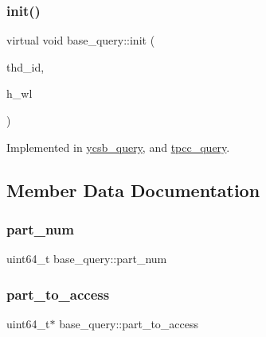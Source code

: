 \subsubsection{\texorpdfstring{init()}{init()}}
{\footnotesize\ttfamily virtual void base\+\_\+query\+::init (\begin{DoxyParamCaption}\item[{uint64\+\_\+t}]{thd\+\_\+id,  }\item[{\hyperlink{classworkload}{workload} $\ast$}]{h\+\_\+wl }\end{DoxyParamCaption})\hspace{0.3cm}{\ttfamily [pure virtual]}}



Implemented in \hyperlink{classycsb__query_a05e09ce39a834921f0b83103ff5ec5e1}{ycsb\+\_\+query}, and \hyperlink{classtpcc__query_a0bb03655040cf0f96ee0601c02c8876f}{tpcc\+\_\+query}.



\subsection{Member Data Documentation}
\mbox{\label{classbase__query_a339bb4ad3eb5490c52fd467267b85fd7}} 
\subsubsection{\texorpdfstring{part\+\_\+num}{part\_num}}
{\footnotesize\ttfamily uint64\+\_\+t base\+\_\+query\+::part\+\_\+num}

\mbox{\label{classbase__query_a81d79eecd1b85d1bd9818f111dadec0c}} 
\subsubsection{\texorpdfstring{part\+\_\+to\+\_\+access}{part\_to\_access}}
{\footnotesize\ttfamily uint64\+\_\+t$\ast$ base\+\_\+query\+::part\+\_\+to\+\_\+access}

\mbox{\label{classbase__query_a946749126cc37a9a749d58a9779c870f}} 

